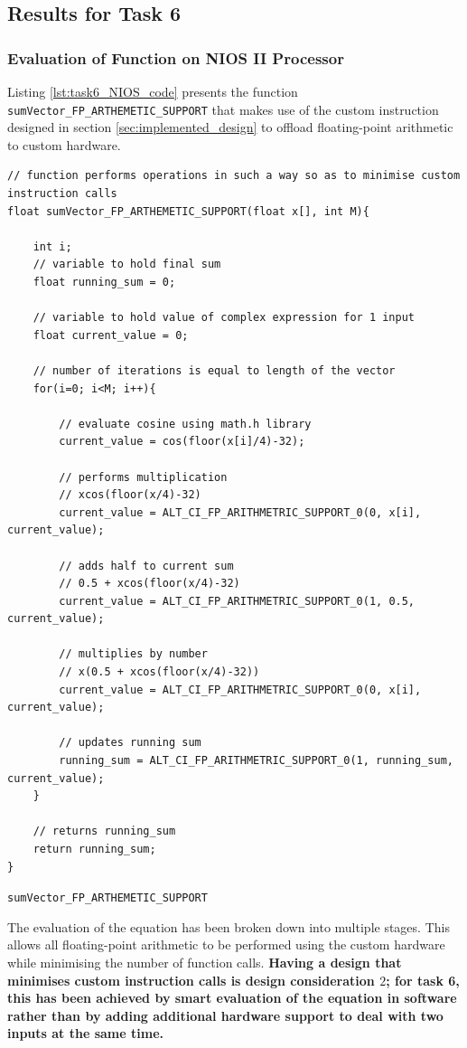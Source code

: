 \documentclass{article}
\begin{document}
\subsection{Results for Task 6}

\subsubsection{Evaluation of Function on NIOS II Processor}\label{sec:task6_nios_code}
Listing \ref{lst:task6_NIOS_code} presents the function {\tt sumVector\_FP\_ARTHEMETIC\_SUPPORT} that makes use of the custom instruction designed in section \ref{sec:implemented_design} to offload floating-point arithmetic to custom hardware. 

\begin{listing}[H]
\begin{verbatim}
// function performs operations in such a way so as to minimise custom instruction calls
float sumVector_FP_ARTHEMETIC_SUPPORT(float x[], int M){

	int i;
	// variable to hold final sum
	float running_sum = 0;
	
	// variable to hold value of complex expression for 1 input
	float current_value = 0;
	
	// number of iterations is equal to length of the vector
	for(i=0; i<M; i++){
		
		// evaluate cosine using math.h library
		current_value = cos(floor(x[i]/4)-32);
		
		// performs multiplication
		// xcos(floor(x/4)-32)
		current_value = ALT_CI_FP_ARITHMETRIC_SUPPORT_0(0, x[i], current_value);
		
		// adds half to current sum
		// 0.5 + xcos(floor(x/4)-32)
		current_value = ALT_CI_FP_ARITHMETRIC_SUPPORT_0(1, 0.5, current_value);
		
		// multiplies by number
		// x(0.5 + xcos(floor(x/4)-32))
		current_value = ALT_CI_FP_ARITHMETRIC_SUPPORT_0(0, x[i], current_value);

		// updates running sum
		running_sum = ALT_CI_FP_ARITHMETRIC_SUPPORT_0(1, running_sum, current_value);
	}
	
	// returns running_sum
	return running_sum;
}
\end{verbatim}
\caption{{\tt sumVector\_FP\_ARTHEMETIC\_SUPPORT}} 
\label{lst:task6_NIOS_code}
\end{listing}



The evaluation of the equation has been broken down into multiple stages. This allows all floating-point arithmetic to be performed using the custom hardware while minimising the number of function calls. \textbf{Having a design that minimises custom instruction calls is design consideration $2$; for task 6, this has been achieved by smart evaluation of the equation in software rather than by adding additional hardware support to deal with two inputs at the same time.}
\end{document}
